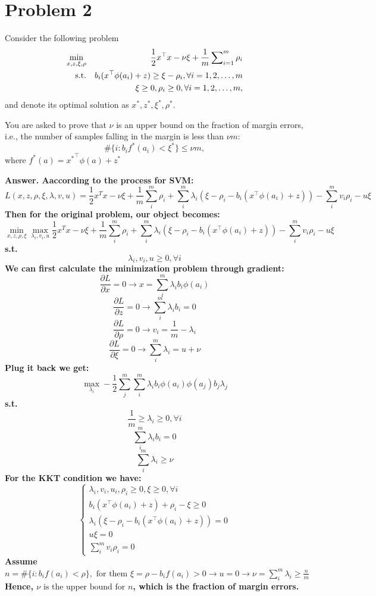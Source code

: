 \documentclass{article}
\theoremstyle{definition}
\theoremstyle{definition}
\theoremstyle{remark}
\begin{document}
\section*{Problem 2}
Consider the following problem
\begin{eqnarray*}
\min_{x,z,\xi,\rho} & & \frac{1}{2} x^\top x - \nu \xi + \frac{1}{m} \sum_{i=1}^m\nolimits \rho_i \\
\mathrm{s.t.} & & b_i (x^\top \phi(a_i) + z) \geq \xi - \rho_i, \forall i = 1, 2, \ldots, m\\
& & \xi \geq 0, \rho_i \geq 0, \forall i = 1, 2, \ldots, m,
\end{eqnarray*}
and denote its optimal solution as $x^*, z^*, \xi^*, \rho^*$.

You are asked to prove that $\nu$ is an upper bound on the fraction of margin errors, i.e., the number of samples falling in the margin is less than $\nu m$:
\[
\#\{i: b_i f^*(a_i) < \xi^* \} \leq \nu m,
\]
where $f^*(a) = {x^*}^\top \phi(a) + z^*$

{\bf{Answer.
Aaccording to the process for SVM:
$$L(x,z,\rho,\xi,\lambda,v,u)=\frac{1}{2}x^Tx-\nu\xi+\frac{1}{m}\sum_i^m\rho_i+\sum_i^m\lambda_i(\xi-\rho_i-b_i(x^\top\phi(a_i)+z))-\sum_i^mv_i\rho_i-u\xi$$
Then for the original problem, our object becomes:
$$\min_{x,z,\rho,\xi}\max_{\lambda_i,v_i,u}\frac{1}{2}x^Tx-\nu\xi+\frac{1}{m}\sum_i^m\rho_i+\sum_i^m\lambda_i(\xi-\rho_i-b_i(x^\top\phi(a_i)+z))-\sum_i^mv_i\rho_i-u\xi$$
s.t. $$\lambda_i,v_i,u\geq0,\forall i$$
We can first calculate the minimization problem through gradient:
$$\frac{\partial L}{\partial x}=0\rightarrow x=\sum_i^m\lambda_ib_i\phi(a_i)$$
$$\frac{\partial L}{\partial z}=0\rightarrow \sum_i^m\lambda_ib_i=0$$
$$\frac{\partial L}{\partial \rho}=0\rightarrow v_i=\frac{1}{m}-\lambda_i$$
$$\frac{\partial L}{\partial \xi}=0\rightarrow \sum_i^m\lambda_i=u+\nu$$
Plug it back we get:
$$\max_{\lambda_i}-\frac{1}{2}\sum_j^m\sum_i^m\lambda_ib_i\phi(a_i)\phi(a_j)b_j\lambda_j$$
s.t. $$\frac{1}{m}\geq\lambda_i\geq0,\forall i$$
$$\sum_i^m\lambda_ib_i=0$$
$$\sum_i^m\lambda_i\geq \nu$$
For the KKT condition we have:
$$\left\{\begin{array}{c}
    \lambda_i,v_i,u_i,\rho_i\geq0,\xi\geq0,\forall i\\
    b_i(x^\top\phi(a_i)+z)+\rho_i-\xi\geq0\\
    \lambda_i(\xi-\rho_i-b_i(x^\top\phi(a_i)+z))=0\\
    u\xi=0\\
    \sum_i^mv_i\rho_i=0
\end{array}\right.$$
Assume $n=\#\{i: b_if(a_i)<\rho\},\text{ for them } \xi=\rho-b_if(a_i)>0\rightarrow u=0\rightarrow \nu=\sum_i^m\lambda_i\geq\frac{n}{m}$
\\Hence, $\nu\text{ is the upper bound for }n$, which is the fraction of margin errors.
}}
\end{document}
